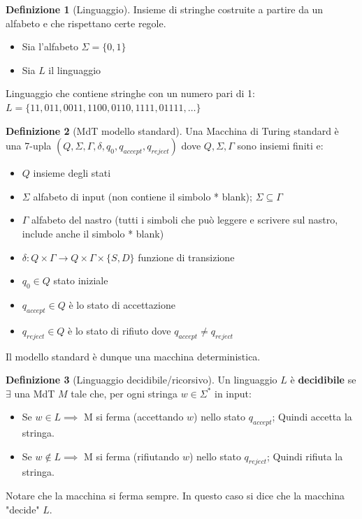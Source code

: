 \documentclass{article}  %
\theoremstyle{definition}
\newtheorem{definition}{Definizione}[section]
\begin{document}
\begin{definition}[Linguaggio]
  Insieme di stringhe costruite a partire da un alfabeto e che rispettano certe regole.
  \begin{esempio}[Esempio]
\footnotesize %
\begin{itemize}
  \item Sia l'alfabeto $\Sigma=\{0,1\}$
  \item Sia $L$ il linguaggio 
\end{itemize}
Linguaggio che contiene stringhe con un numero pari di 1:\newline
$L=\{11,011,0011,1100,0110,1111,01111,\dots\}$ 
\end{esempio}
\end{definition}

\begin{definition}[MdT modello standard] Una Macchina di Turing standard è una 7-upla
   $(Q,\Sigma,\Gamma,\delta,q_0,q_{accept}, q_{reject})$ dove $Q,\Sigma,\Gamma$ sono insiemi finiti e:
  \begin{itemize}
    \item $Q$ insieme degli stati
    \item $\Sigma$ alfabeto di input (non contiene il simbolo * blank); $\Sigma \subseteq \Gamma$
    \item $\Gamma$ alfabeto del nastro (tutti i simboli che può leggere e scrivere sul nastro, include anche il simbolo * blank)
    \item $\delta:Q\times\Gamma \rightarrow Q\times\Gamma\times\{S,D\}$ funzione di transizione
    \item $q_0 \in Q$ stato iniziale
    \item $q_{accept} \in Q$ è lo stato di accettazione
    \item $q_{reject} \in Q$ è lo stato di rifiuto dove $q_{accept} \neq q_{reject}$
  \end{itemize}
  Il modello standard è dunque una macchina deterministica.
\end{definition}

\begin{definition}[Linguaggio decidibile/ricorsivo]
  Un linguaggio $L$ è \textbf{decidibile} se $\exists$ una MdT $M$ tale che, per ogni stringa $w\in \Sigma^*$ in input:
  \begin{itemize}
    \item Se $w \in L \implies$ M si ferma (accettando $w$) nello stato $q_{accept}$; Quindi accetta la stringa.
    \item Se $w \notin L \implies$ M si ferma (rifiutando $w$) nello stato $q_{reject}$; Quindi rifiuta la stringa.
  \end{itemize}
Notare che la macchina si ferma sempre. In questo caso si dice che la macchina "decide" $L$.
\end{definition}
\end{document}
